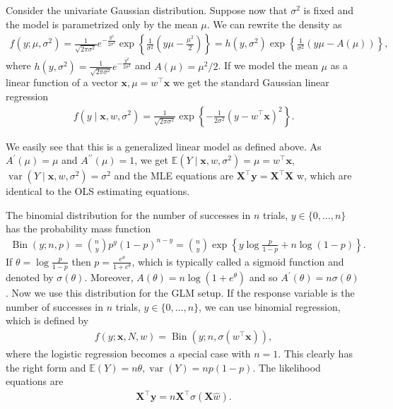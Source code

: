 \begin{eg} Consider the univariate Gaussian distribution. Suppose now that $\sigma^2$ is fixed and the model is parametrized only by the mean $\mu$. We can rewrite the density as
\begin{align*}
f\left(y ; \mu, \sigma^2\right)=\frac{1}{\sqrt{2 \pi \sigma^2}} e^{-\frac{y^2}{2 \sigma^2}} \exp \left\{\frac{1}{\sigma^2}\left(y \mu-\frac{\mu^2}{2}\right)\right\}=h\left(y, \sigma^2\right) \exp \left\{\frac{1}{\sigma^2}(y \mu-A(\mu))\right\},
\end{align*}
where $h\left(y, \sigma^2\right)=\frac{1}{\sqrt{2 \pi \sigma^2}} e^{-\frac{y^2}{2 \sigma^2}}$ and $A(\mu)=\mu^2 / 2$. If we model the mean $\mu$ as a linear function of a vector $\mathbf{x}, \mu=w^{\top} \mathbf{x}$ we get the standard Gaussian linear regression
\begin{align*}
f\left(y \mid \mathbf{x}, w, \sigma^2\right)=\frac{1}{\sqrt{2 \pi \sigma^2}} \exp \left\{-\frac{1}{2 \sigma^2}\left(y-w^{\top} \mathbf{x}\right)^2\right\} .
\end{align*}


We easily see that this is a generalized linear model as defined above. As $A^{\prime}(\mu)=\mu$ and $A^{\prime \prime}(\mu)=1$, we get $\mathbb{E}\left(Y \mid \mathbf{x}, w, \sigma^2\right)=\mu=w^{\top} \mathbf{x}$, $\operatorname{var}\left(Y \mid \mathbf{x}, w, \sigma^2\right)=\sigma^2$ and the MLE equations are $\mathbf{X}^{\top} \mathbf{y}= \mathbf{X}^{\top} \mathbf{X}$ w, which are identical to the OLS estimating equations.
\end{eg}

\begin{eg}
     The binomial distribution for the number of successes in $n$ trials, $y \in\{0, \ldots, n\}$ has the probability mass function
\begin{align*}
\operatorname{Bin}(y ; n, p)=\binom{n}{y} p^y(1-p)^{n-y}=\binom{n}{y} \exp \left\{y \log \frac{p}{1-p}+n \log (1-p)\right\} .
\end{align*}
If $\theta=\log \frac{p}{1-p}$ then $p=\frac{e^\theta}{1+e^\theta}$, which is typically called a sigmoid function and denoted by $\sigma(\theta)$. Moreover, $A(\theta)=n \log \left(1+e^\theta\right)$ and so $A^{\prime}(\theta)= n \sigma(\theta)$. Now we use this distribution for the GLM setup. If the response variable is the number of successes in $n$ trials, $y \in\{0, \ldots, n\}$, we can use binomial regression, which is defined by
\begin{align*}
f(y ; \mathbf{x}, N, w)=\operatorname{Bin}\left(y ; n, \sigma\left(w^{\top} \mathbf{x}\right)\right),
\end{align*}
where the logistic regression becomes a special case with $n=1$. This clearly has the right form and $\mathbb{E}(Y)=n \theta, \operatorname{var}(Y)=n p(1-p)$. The likelihood equations are
\begin{align*}
\mathbf{X}^{\top} \mathbf{y}=n \mathbf{X}^{\top} \sigma(\mathbf{X} \hat{w}) .
\end{align*}
\end{eg}

